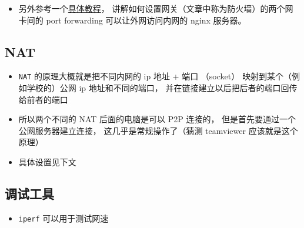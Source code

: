 \begin{itemize}
\item 另外参考一个\href{https://www.digitalocean.com/community/tutorials/how-to-forward-ports-through-a-linux-gateway-with-iptables}{具体教程}， 讲解如何设置网关（文章中称为防火墙）的两个网卡间的 port forwarding 可以让外网访问内网的 nginx 服务器。 
\end{itemize}

\subsection{NAT}
\begin{itemize}
\item \verb|NAT| 的原理大概就是把不同内网的 ip 地址 + 端口 （socket） 映射到某个（例如学校的）公网 ip 地址和不同的端口， 并在链接建立以后把后者的端口回传给前者的端口
\item 所以两个不同的 NAT 后面的电脑是可以 P2P 连接的， 但是首先要通过一个公网服务器建立连接， 这几乎是常规操作了（猜测 teamviewer 应该就是这个原理）
\item 具体设置见下文
\end{itemize}

\subsection{调试工具}
\begin{itemize}
\item \verb|iperf| 可以用于测试网速
\end{itemize}


